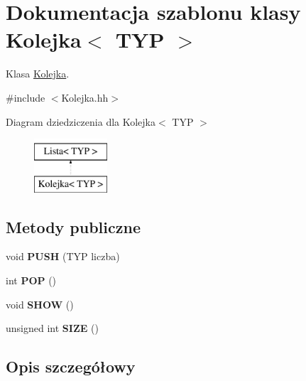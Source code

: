 \hypertarget{class_kolejka}{\section{Dokumentacja szablonu klasy Kolejka$<$ T\-Y\-P $>$}
\label{class_kolejka}
}


Klasa \hyperlink{class_kolejka}{Kolejka}.  




{\ttfamily \#include $<$Kolejka.\-hh$>$}

Diagram dziedziczenia dla Kolejka$<$ T\-Y\-P $>$\begin{figure}[H]
\begin{center}
\leavevmode
\includegraphics[height=2.000000cm]{class_kolejka}
\end{center}
\end{figure}
\subsection*{Metody publiczne}
\begin{DoxyCompactItemize}
\item 
\hypertarget{class_kolejka_a66056e67a0514466d7771da351e8468b}{void {\bfseries P\-U\-S\-H} (T\-Y\-P liczba)}\label{class_kolejka_a66056e67a0514466d7771da351e8468b}

\item 
\hypertarget{class_kolejka_ab1d8e5d4a855fb2156201a57cc0a9a39}{int {\bfseries P\-O\-P} ()}\label{class_kolejka_ab1d8e5d4a855fb2156201a57cc0a9a39}

\item 
\hypertarget{class_kolejka_a26b5afbcc9f892a41acbd3aed062ee50}{void {\bfseries S\-H\-O\-W} ()}\label{class_kolejka_a26b5afbcc9f892a41acbd3aed062ee50}

\item 
\hypertarget{class_kolejka_a06a7fe157ff434771a700ffd084dc7a2}{unsigned int {\bfseries S\-I\-Z\-E} ()}\label{class_kolejka_a06a7fe157ff434771a700ffd084dc7a2}

\end{DoxyCompactItemize}


\subsection{Opis szczegółowy}
